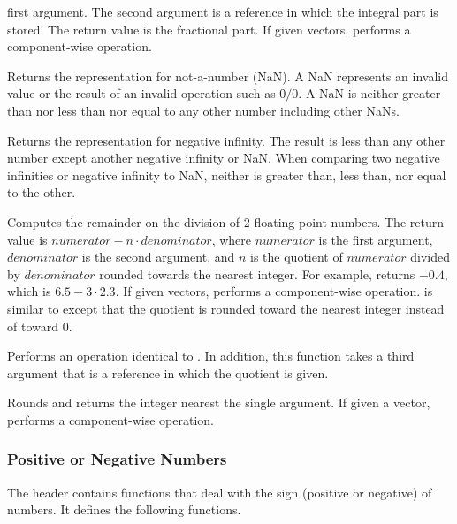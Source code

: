 \begin{description}
  first argument. The second argument is a reference in which the integral
  part is stored. The return value is the fractional part. If given
  vectors,  performs a component-wise operation.
\item[\daxmath{Nan}]  Returns the 
  representation for not-a-number (NaN). A NaN represents an invalid value
  or the result of an invalid operation such as $0/0$. A NaN is neither
  greater than nor less than nor equal to any other number including other
  NaNs.
\item[\daxmath{NegativeInfinity}] Returns the  representation
  for negative infinity. The result is less than any other number except
  another negative infinity or NaN. When comparing two negative infinities
  or negative infinity to NaN, neither is greater than, less than, nor
  equal to the other.
\item[\daxmath{Remainder}]  Computes the remainder on the
  division of 2 floating point numbers. The return value is $numerator - n
  \cdot denominator$, where $numerator$ is the first argument,
  $denominator$ is the second argument, and $n$ is the quotient of
  $numerator$ divided by $denominator$ rounded towards the nearest
  integer. For example,  returns
  $-0.4$, which is $6.5 - 3\cdot2.3$. If given vectors,
   performs a component-wise
  operation.  is similar to 
  except that the quotient is rounded toward the nearest integer instead of
  toward 0.
\item[\daxmath{RemainderQuotient}] Performs an operation identical to
  . In addition, this function takes a third
  argument that is a reference in which the quotient is given.
\item[\daxmath{Round}] Rounds and returns the integer nearest the single
  argument. If given a vector, performs a component-wise operation.
\end{description}

\subsubsection{Positive or Negative Numbers}

The  header contains functions that deal with
the sign (positive or negative) of numbers. It defines the following
functions.


